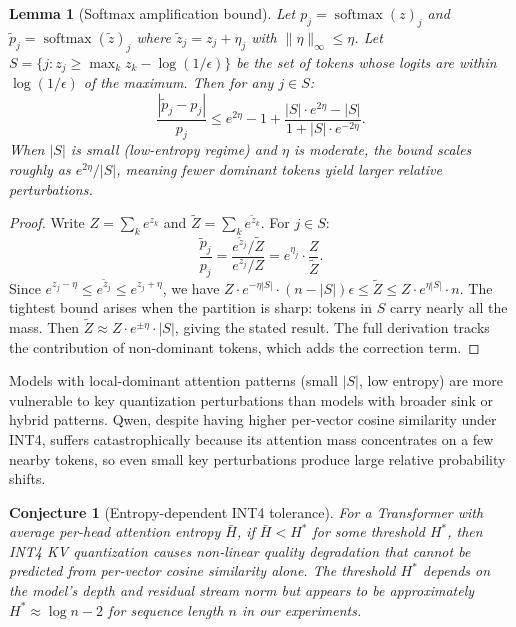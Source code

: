 \documentclass[11pt]{article}
\DeclareMathOperator{\softmax}{softmax}
\theoremstyle{plain}
\newtheorem{lemma}{Lemma}
\newtheorem{conjecture}{Conjecture}
\theoremstyle{definition}
\begin{document}
\begin{lemma}[Softmax amplification bound]
\label{lem:softmax-amp}
Let $p_j = \softmax(z)_j$ and $\tilde p_j = \softmax(\tilde z)_j$ where $\tilde z_j = z_j + \eta_j$ with $\|\eta\|_\infty \le \eta$.  Let $S = \{j : z_j \ge \max_k z_k - \log(1/\epsilon)\}$ be the set of tokens whose logits are within $\log(1/\epsilon)$ of the maximum.  Then for any $j \in S$:
\begin{equation}
  \frac{|\tilde p_j - p_j|}{p_j} \le e^{2\eta} - 1 + \frac{|S| \cdot e^{2\eta} - |S|}{1 + |S| \cdot e^{-2\eta}}.
  \label{eq:softmax-amp-bound}
\end{equation}
When $|S|$ is small (low-entropy regime) and $\eta$ is moderate, the bound scales roughly as $e^{2\eta}/|S|$, meaning fewer dominant tokens yield larger relative perturbations.
\end{lemma}
\begin{proof}
Write $Z = \sum_k e^{z_k}$ and $\tilde Z = \sum_k e^{\tilde z_k}$.  For $j\in S$:
\[
  \frac{\tilde p_j}{p_j} = \frac{e^{\tilde z_j}/\tilde Z}{e^{z_j}/Z} = e^{\eta_j} \cdot \frac{Z}{\tilde Z}.
\]
Since $e^{z_j - \eta} \le e^{\tilde z_j} \le e^{z_j + \eta}$, we have $Z \cdot e^{-\eta|S|} \cdot (n-|S|)\epsilon \le \tilde Z \le Z \cdot e^{\eta|S|} \cdot n$.  The tightest bound arises when the partition is sharp: tokens in $S$ carry nearly all the mass.  Then $\tilde Z \approx Z \cdot e^{\pm\eta} \cdot |S|$, giving the stated result.  The full derivation tracks the contribution of non-dominant tokens, which adds the correction term.
\end{proof}

Models with local-dominant attention patterns (small $|S|$, low entropy) are more vulnerable to key quantization perturbations than models with broader sink or hybrid patterns.  Qwen, despite having higher per-vector cosine similarity under INT4, suffers catastrophically because its attention mass concentrates on a few nearby tokens, so even small key perturbations produce large relative probability shifts.

\begin{conjecture}[Entropy-dependent INT4 tolerance]
\label{conj:entropy}
For a Transformer with average per-head attention entropy $\bar H$, if $\bar H < H^*$ for some threshold $H^*$, then INT4 KV quantization causes non-linear quality degradation that cannot be predicted from per-vector cosine similarity alone.  The threshold $H^*$ depends on the model's depth and residual stream norm but appears to be approximately $H^* \approx \log n - 2$ for sequence length $n$ in our experiments.
\end{conjecture}
\end{document}
